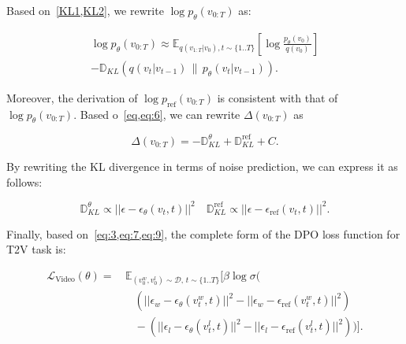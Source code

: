 Based on~\cref{KL1,KL2}, we rewrite \( \log p_\theta(v_{0:T}) \) as:

\begin{equation}
\label{eq:6}
\begin{split}
\log p_\theta(v_{0:T}) \approx \mathbb{E}_{q(v_{1:T} | v_0), t \sim \{1..T\}} \left[ \log \frac{p_\theta(v_0)}{q(v_0)} \right] \\ 
- \mathbb{D}_{KL}\left( q(v_t | v_{t-1}) \, \| \, p_\theta(v_t | v_{t-1}) \right).
\end{split}
\end{equation}



Moreover, the derivation of \( \log p_{\text{ref}}(v_{0:T}) \) is consistent with that of \( \log p_\theta(v_{0:T}) \). Based o~\cref{eq,eq:6}, we can rewrite \( \Delta(v_{0:T}) \) as

\begin{equation}
\label{eq:7}
\Delta(v_{0:T}) = -\mathbb{D}_{KL}^{\theta} + \mathbb{D}_{KL}^{\text{ref}} + C.
\end{equation}

By rewriting the KL divergence in terms of noise prediction, we can express it as follows:

\begin{equation}
\label{eq:9}
\mathbb{D}_{KL}^{\theta} \propto ||\epsilon - \epsilon_\theta(v_t, t)||^2 
\quad \mathbb{D}_{KL}^{\text{ref}} \propto ||\epsilon - \epsilon_\text{ref}(v_t, t)||^2.
\end{equation}



Finally, based on~\cref{eq:3,eq:7,eq:9}, the complete form of the DPO loss function for T2V task is:

\begin{equation}
\label{lab:2}
\begin{aligned}
\mathcal{L}_{\text{Video}}(\theta) = & \, \mathbb{E}_{(v_{0}^w, v_{0}^l) \sim \mathcal{D}, \, t \sim \{1..T\}} \Bigg[\beta \log \sigma \Bigg( \\
& \quad \left( ||\epsilon_w - \epsilon_\theta(v^w_t, t)||^2 - ||\epsilon_w - \epsilon_{\text{ref}}(v^w_t, t)||^2 \right) \\
& \quad - \left( ||\epsilon_l - \epsilon_\theta(v^l_t, t)||^2 - ||\epsilon_l - \epsilon_{\text{ref}}(v^l_t, t)||^2 \right) \Bigg) \Bigg].
\end{aligned}
\end{equation}





